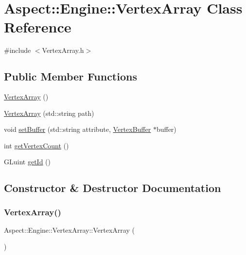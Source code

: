 \hypertarget{class_aspect_1_1_engine_1_1_vertex_array}{}\section{Aspect\+:\+:Engine\+:\+:Vertex\+Array Class Reference}
\label{class_aspect_1_1_engine_1_1_vertex_array}


{\ttfamily \#include $<$Vertex\+Array.\+h$>$}

\subsection*{Public Member Functions}
\begin{DoxyCompactItemize}
\item 
\mbox{\hyperlink{class_aspect_1_1_engine_1_1_vertex_array_a48a7d8516fbe14a78e48b7494a5c569c}{Vertex\+Array}} ()
\item 
\mbox{\hyperlink{class_aspect_1_1_engine_1_1_vertex_array_a684a84192f2f5f14de6cff0a14ef686b}{Vertex\+Array}} (std\+::string path)
\item 
void \mbox{\hyperlink{class_aspect_1_1_engine_1_1_vertex_array_a0d986459ab43f774a9201667ff49672f}{set\+Buffer}} (std\+::string attribute, \mbox{\hyperlink{class_aspect_1_1_engine_1_1_vertex_buffer}{Vertex\+Buffer}} $\ast$buffer)
\item 
int \mbox{\hyperlink{class_aspect_1_1_engine_1_1_vertex_array_a65dd6d4b63e56fa07470f56b21c2930c}{get\+Vertex\+Count}} ()
\item 
G\+Luint \mbox{\hyperlink{class_aspect_1_1_engine_1_1_vertex_array_add09721b84713dd247942d1ddad3de80}{get\+Id}} ()
\end{DoxyCompactItemize}


\subsection{Constructor \& Destructor Documentation}
\mbox{\label{class_aspect_1_1_engine_1_1_vertex_array_a48a7d8516fbe14a78e48b7494a5c569c}} 
\subsubsection{\texorpdfstring{Vertex\+Array()}{VertexArray()}\hspace{0.1cm}{\footnotesize\ttfamily [1/2]}}
{\footnotesize\ttfamily Aspect\+::\+Engine\+::\+Vertex\+Array\+::\+Vertex\+Array (\begin{DoxyParamCaption}{ }\end{DoxyParamCaption})}

